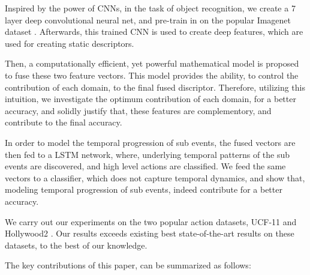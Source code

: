 Inspired by the power of CNNs, in the task of object recognition, we create a 7 layer deep
convolutional neural net, and pre-train in on the popular Imagenet dataset \cite{deng2012imagenet}.
Afterwards, this trained CNN is used to create deep features, which are used for creating static descriptors.

Then, a computationally efficient, yet powerful mathematical model is proposed to fuse these
two feature vectors. This model provides the ability, to control the contribution of each domain,
to the final fused discriptor. Therefore, utilizing this intuition, we investigate the
optimum contribution of each domain, for a better accuracy, and solidly justify that, these
features are complementory, and contribute to the final accuracy.

In order to model the temporal progression of sub events, the fused vectors are then fed to
a LSTM network, where, underlying temporal patterns of the sub events are discovered, and high level actions
are classified. We feed the same vectors to a classifier, which does not capture temporal dynamics,
and show that, modeling temporal progression of sub events, indeed contribute for a better
accuracy.

We carry out our experiments on the two popular action datasets, UCF-11 \cite{liu2009recognizing}
and Hollywood2 \cite{marszalek2009actions}. Our results exceeds existing best state-of-the-art
results on these datasets, to the best of our knowledge.

The key contributions of this paper, can be summarized as follows:

